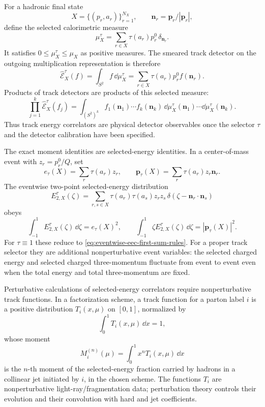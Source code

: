 For a hadronic final state
\[
  X=\{(p_r,a_r)\}_{r=1}^{N_X},
  \qquad
  \mathbf n_r=\mathbf p_r/|\mathbf p_r|,
\]
define the selected calorimetric measure
\begin{equation}
  \mu_X^\tau
  =
  \sum_{r\in X}\tau(a_r)p_r^0\,\delta_{\mathbf n_r}.
  \label{eq:qcd-track-calorimetric-measure}
\end{equation}
It satisfies \(0\le\mu_X^\tau\le\mu_X\) as positive measures.  The smeared
track detector on the outgoing multiplication representation is therefore
\[
  \widehat{\mathcal E}_X^\tau(f)
  =
  \int_{S^2}f\,\dd\mu_X^\tau
  =
  \sum_{r\in X}\tau(a_r)p_r^0 f(\mathbf n_r).
\]
Products of track detectors are products of this selected measure:
\begin{equation}
  \prod_{j=1}^{k}\widehat{\mathcal E}_X^\tau(f_j)
  =
  \int_{(S^2)^k}
  f_1(\mathbf n_1)\cdots f_k(\mathbf n_k)\,
  \dd\mu_X^\tau(\mathbf n_1)\cdots\dd\mu_X^\tau(\mathbf n_k).
  \label{eq:qcd-track-detector-product-measure}
\end{equation}
Thus track energy correlators are physical detector observables once the
selector \(\tau\) and the detector calibration have been specified.

The exact moment identities are selected-energy identities.  In a
center-of-mass event with \(z_r=p_r^0/Q\), set
\[
  e_\tau(X)=\sum_{r}\tau(a_r)z_r,\qquad
  \mathbf p_\tau(X)=\sum_{r}\tau(a_r)z_r\mathbf n_r .
\]
The eventwise two-point selected-energy distribution
\[
  E_{2,X}^{\tau}(\zeta)
  =
  \sum_{r,s\in X}
  \tau(a_r)\tau(a_s)z_rz_s\,
  \delta(\zeta-\mathbf n_r\cdot\mathbf n_s)
\]
obeys
\begin{equation}
  \int_{-1}^{1}E_{2,X}^{\tau}(\zeta)\,\dd\zeta
  =
  e_\tau(X)^2,
  \qquad
  \int_{-1}^{1}\zeta E_{2,X}^{\tau}(\zeta)\,\dd\zeta
  =
  |\mathbf p_\tau(X)|^2.
  \label{eq:qcd-track-eec-selected-moments}
\end{equation}
For \(\tau\equiv1\) these reduce to
\eqref{eq:eventwise-eec-first-sum-rules}.  For a proper track selector they
are additional nonperturbative event variables: the selected charged energy
and selected charged three-momentum fluctuate from event to event even when
the total energy and total three-momentum are fixed.

Perturbative calculations of selected-energy correlators require
nonperturbative track functions.  In a factorization scheme, a track function
for a parton label \(i\) is a positive distribution \(T_i(x,\mu)\) on
\([0,1]\), normalized by
\[
  \int_0^1 T_i(x,\mu)\,\dd x=1,
\]
whose moment
\[
  M_i^{(n)}(\mu)
  =
  \int_0^1 x^nT_i(x,\mu)\,\dd x
\]
is the \(n\)-th moment of the selected-energy fraction carried by hadrons in a
collinear jet initiated by \(i\), in the chosen scheme.  The functions
\(T_i\) are nonperturbative light-ray/fragmentation data; perturbation theory
controls their evolution and their convolution with hard and jet
coefficients.

